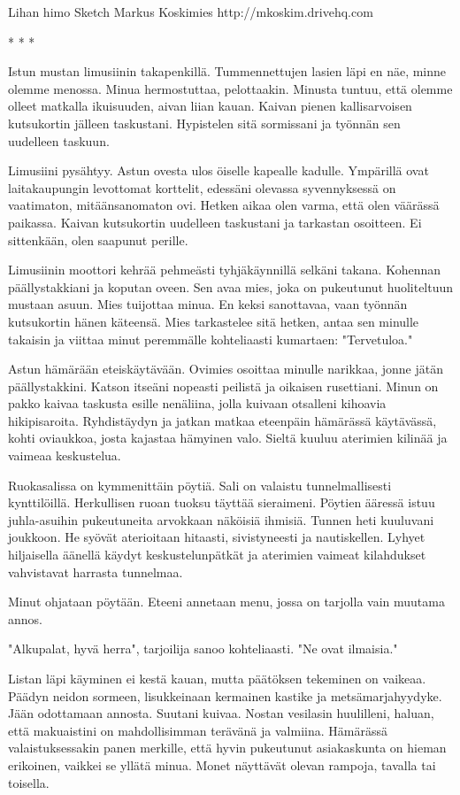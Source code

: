 \shortstory
{Lihan himo}
{}
{Sketch}
{Markus Koskimies}
{http://mkoskim.drivehq.com}
{}
\published
{}
{}

* * *

Istun mustan limusiinin takapenkillä. Tummennettujen lasien läpi en näe, minne olemme menossa. Minua hermostuttaa, pelottaakin. Minusta tuntuu, että olemme olleet matkalla ikuisuuden, aivan liian kauan. Kaivan pienen kallisarvoisen kutsukortin jälleen taskustani. Hypistelen sitä sormissani ja työnnän sen uudelleen taskuun.


Limusiini pysähtyy. Astun ovesta ulos öiselle kapealle kadulle. Ympärillä ovat laitakaupungin levottomat korttelit, edessäni olevassa syvennyksessä on vaatimaton, mitäänsanomaton ovi. Hetken aikaa olen varma, että olen väärässä paikassa. Kaivan kutsukortin uudelleen taskustani ja tarkastan osoitteen. Ei sittenkään, olen saapunut perille.


Limusiinin moottori kehrää pehmeästi tyhjäkäynnillä selkäni takana. Kohennan päällystakkiani ja koputan oveen. Sen avaa mies, joka on pukeutunut huoliteltuun mustaan asuun. Mies tuijottaa minua. En keksi sanottavaa, vaan työnnän kutsukortin hänen käteensä. Mies tarkastelee sitä hetken, antaa sen minulle takaisin ja viittaa minut peremmälle kohteliaasti kumartaen: "Tervetuloa."


Astun hämärään eteiskäytävään. Ovimies osoittaa minulle narikkaa, jonne jätän päällystakkini. Katson itseäni nopeasti peilistä ja oikaisen rusettiani. Minun on pakko kaivaa taskusta esille nenäliina, jolla kuivaan otsalleni kihoavia hikipisaroita. Ryhdistäydyn ja jatkan matkaa eteenpäin hämärässä käytävässä, kohti oviaukkoa, josta kajastaa hämyinen valo. Sieltä kuuluu aterimien kilinää ja vaimeaa keskustelua.


Ruokasalissa on kymmenittäin pöytiä. Sali on valaistu tunnelmallisesti kynttilöillä. Herkullisen ruoan tuoksu täyttää sieraimeni. Pöytien ääressä istuu juhla-asuihin pukeutuneita arvokkaan näköisiä ihmisiä. Tunnen heti kuuluvani joukkoon. He syövät aterioitaan hitaasti, sivistyneesti ja nautiskellen. Lyhyet hiljaisella äänellä käydyt keskustelunpätkät ja aterimien vaimeat kilahdukset vahvistavat harrasta tunnelmaa.


Minut ohjataan pöytään. Eteeni annetaan menu, jossa on tarjolla vain muutama annos.


"Alkupalat, hyvä herra", tarjoilija sanoo kohteliaasti. "Ne ovat ilmaisia."


Listan läpi käyminen ei kestä kauan, mutta päätöksen tekeminen on vaikeaa. Päädyn neidon sormeen, lisukkeinaan kermainen kastike ja metsämarjahyydyke. Jään odottamaan annosta. Suutani kuivaa. Nostan vesilasin huulilleni, haluan, että makuaistini on mahdollisimman terävänä ja valmiina. Hämärässä valaistuksessakin panen merkille, että hyvin pukeutunut asiakaskunta on hieman erikoinen, vaikkei se yllätä minua. Monet näyttävät olevan rampoja, tavalla tai toisella.


